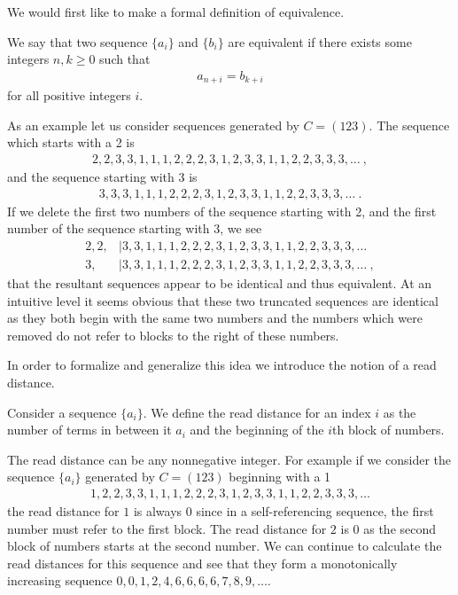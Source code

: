 \documentclass[runningheads,a4paper]{llncs}
\begin{document}
We would first like to make a formal definition of equivalence. 
\begin{definition}
We say that two sequence $\{a_i\}$ and $\{b_i\}$ are equivalent if there exists some integers $n, k \geq 0$ such that 
\begin{align*}
a_{n+i} = b_{k+i}
\end{align*}
for all positive integers $i$. 
\end{definition}

As an example let us consider sequences generated by $C = (123)$. The sequence which starts with a 2 is 
\begin{align*}
2,2,3,3,1,1,1,2,2,2,3,1,2,3,3,1,1,2,2,3,3,3,\dots \ ,
\end{align*}
and the sequence starting with 3 is 
\begin{align*}
3,3,3,1,1,1,2,2,2,3,1,2,3,3,1,1,2,2,3,3,3,\dots \ .
\end{align*}
If we delete the first two numbers of the sequence starting with 2, and the first number of the sequence starting with 3, we see 
\begin{align*}
2,2,&|3,3,1,1,1,2,2,2,3,1,2,3,3,1,1,2,2,3,3,3,\dots\\
3,&|3,3,1,1,1,2,2,2,3,1,2,3,3,1,1,2,2,3,3,3,\dots \ ,
\end{align*}
that the resultant sequences appear to be identical and thus equivalent. At an intuitive level it seems obvious that these two truncated sequences are identical as they both begin with the same two numbers and the numbers which were removed do not refer to blocks to the right of these numbers.   

In order to formalize and generalize this idea we introduce the notion of a read distance.  
\begin{definition} Consider a sequence $\{a_i\}$. We define the read distance for an index $i$ as the number of terms in between it $a_i$ and the beginning of the $i$th block of numbers.
\end{definition}
The read distance can be any nonnegative integer. For example if we consider the sequence $\{a_i\}$ generated by $C = (1 2 3)$ beginning with a 1  
\begin{align*}
1,2,2,3,3,1,1,1,2,2,2,3,1,2,3,3,1,1,2,2,3,3,3,\dots
\end{align*}
the read distance for $1$ is always $0$ since in a self-referencing sequence, the first number must refer to the first block. The read distance for $2$ is $0$ as the second block of numbers starts at the second number. We can continue to calculate the read distances for this sequence and see that they form a monotonically increasing sequence $0, 0 ,1,2,4,6,6,6,6,7,8,9,\ldots$. 
\end{document}
